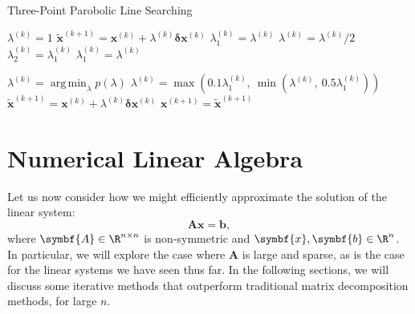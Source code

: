 \documentclass{article}
\DeclareMathOperator{\argmin}{arg\, min}
\begin{document}
\begin{algorithm}[H]
    \caption{Three-Point Parobolic Line Searching}
    \begin{algorithmic}
        \State \(\lambda^{\left( k \right)} = 1\)
        \State \(\tilde{\symbf{x}}^{\left( k + 1 \right)} = \symbf{x}^{\left( k \right)} + \lambda^{\left( k \right)} \symbf{\delta} \symbf{x}^{\left( k \right)}\) 
        \State \(\lambda_1^{\left( k \right)} = \lambda^{\left( k \right)}\)
        \State \(\lambda^{\left( k \right)} = \lambda^{\left( k \right)} / 2\)
        \Else
        \State \(\lambda_2^{\left( k \right)} = \lambda_1^{\left( k \right)}\)
        \State \(\lambda_1^{\left( k \right)} = \lambda^{\left( k \right)}\)

        \State \(\lambda^{\left( k \right)} = \argmin_{\lambda} p\left( \lambda \right)\)
        \State \(\lambda^{\left( k \right)} = \max{\left( 0.1 \lambda_1^{\left( k \right)},\: \min{\left( \lambda^{\left( k \right)},\: 0.5 \lambda_1^{\left( k \right)} \right)} \right)}\) 
        \EndIf
        \State \(\tilde{\symbf{x}}^{\left( k+1 \right)} = \symbf{x}^{\left( k \right)} + \lambda^{\left( k \right)} \symbf{\delta}{\symbf{x}}^{\left( k \right)}\)
        \EndWhile
        \State \(\symbf{x}^{\left( k+1 \right)} = \tilde{\symbf{x}}^{\left( k+1 \right)}\)
    \end{algorithmic}
\end{algorithm}
\part{Numerical Linear Algebra}
Let us now consider how we might efficiently approximate the solution
of the linear system:
\begin{equation*}
    \symbf{A} \symbf{x} = \symbf{b},
\end{equation*}
where \(\symbf{A} \in \R^{n \times n}\) is non-symmetric and \(\symbf{x},\symbf{b} \in \R^n\).
In particular, we will explore the case where \(\symbf{A}\) is large and
sparse, as is the case for the linear systems we have seen thus far. In
the following sections, we will discuss some iterative methods that
outperform traditional matrix decomposition methods, for large \(n\).
\end{document}
